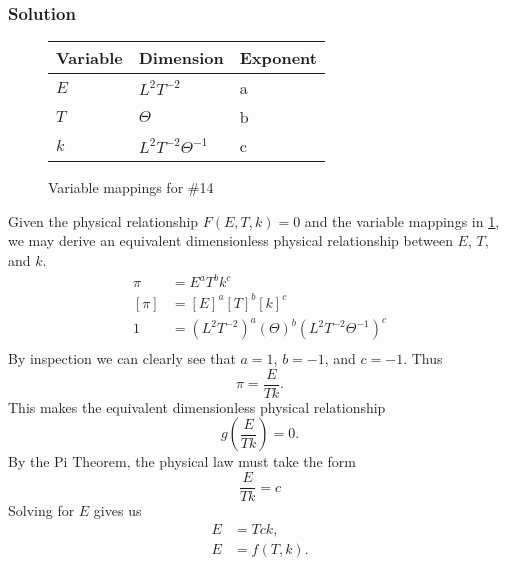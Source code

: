 \documentclass[12pt,twoside]{article}
\begin{document}
  \subsubsection*{Solution}
  \begin{figure}
    \centering
    \begin{tabularx}{0.5\textwidth}{XXX}
      Variable & Dimension & Exponent \\ \midrule
      $E$ & $L^2T^{-2}$ & a \\
      $T$ & $\Theta$ & b \\
      $k$ & $L^2T^{-2}\Theta^{-1}$ & c \\
    \end{tabularx}
    \caption{Variable mappings for \#14}
\label{fig:14-var-mappings}
  \end{figure}
  Given the physical relationship $F(E,T,k)=0$ and the variable mappings in
  \cref{fig:14-var-mappings}, we may derive an equivalent dimensionless physical
  relationship between $E$, $T$, and $k$.
  \begin{equation*}
    \begin{aligned}
      \pi &= E^a T^b k^c \\
      [\pi] &= {[E]}^a {[T]}^b {[k]}^c \\
      1 &= {(L^2T^{-2})}^a {(\Theta)}^{b} {(L^2T^{-2}\Theta^{-1})}^c \\
    \end{aligned}
  \end{equation*}
  By inspection we can clearly see that $a=1$, $b=-1$, and $c=-1$. Thus
  \begin{equation*}
    \pi = \frac{E}{Tk}.
  \end{equation*}
  This makes the equivalent dimensionless physical relationship
  \begin{equation*}
    g\left(\frac{E}{Tk}\right) = 0.
  \end{equation*}
  By the Pi Theorem, the physical law must take the form
  \begin{equation*}
    \frac{E}{Tk} = c
  \end{equation*}
  Solving for $E$ gives us
  \begin{equation*}
    \boxed{
      \begin{aligned}
        E &= Tck, \\
        E &= f(T,k). \\
      \end{aligned}
    }
  \end{equation*}
\end{document}

